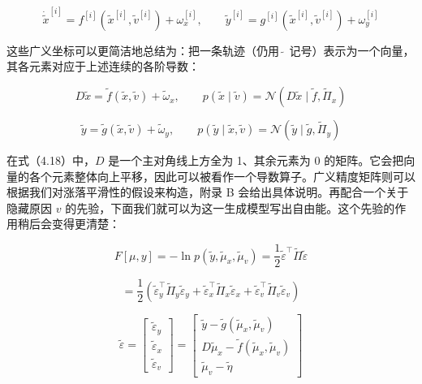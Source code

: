 \begin{equation}
\dot{\tilde{x}}^{[i]} = f^{[i]}(\tilde{x}^{[i]}, \tilde{v}^{[i]}) + \omega_x^{[i]}, \qquad
\tilde{y}^{[i]} = g^{[i]}(\tilde{x}^{[i]}, \tilde{v}^{[i]}) + \omega_y^{[i]}
\tag{4.17}
\end{equation}

这些广义坐标可以更简洁地总结为：把一条轨迹（仍用 $\tilde{\ }$ 记号）表示为一个向量，其各元素对应于上述连续的各阶导数：

\begin{equation}
D\tilde{x} = \tilde{f}(\tilde{x}, \tilde{v}) + \tilde{\omega}_x,
\qquad
p(\tilde{x} \mid \tilde{v}) = \mathcal{N}(D\tilde{x} \mid \tilde{f}, \tilde{\Pi}_x)
\tag{4.18}
\end{equation}

\begin{equation}
\tilde{y} = \tilde{g}(\tilde{x}, \tilde{v}) + \tilde{\omega}_y,
\qquad
p(\tilde{y} \mid \tilde{x}, \tilde{v}) = \mathcal{N}(\tilde{y} \mid \tilde{g}, \tilde{\Pi}_y)
\tag{4.18}
\end{equation}

在式（4.18）中，$D$ 是一个主对角线上方全为 1、其余元素为 0 的矩阵。它会把向量的各个元素整体向上平移，因此可以被看作一个导数算子。广义精度矩阵则可以根据我们对涨落平滑性的假设来构造，附录 B 会给出具体说明。再配合一个关于隐藏原因 $v$ 的先验，下面我们就可以为这一生成模型写出自由能。这个先验的作用稍后会变得更清楚：

\begin{equation}
F[\mu, y] = -\ln p(\tilde{y}, \tilde{\mu}_x, \tilde{\mu}_v)
= \frac{1}{2}\tilde{\varepsilon}^{\top}\tilde{\Pi}\tilde{\varepsilon}
\tag{4.19}
\end{equation}

\begin{equation}
= \frac{1}{2}
\left(
\tilde{\varepsilon}_y^{\top}\tilde{\Pi}_y\tilde{\varepsilon}_y
+ \tilde{\varepsilon}_x^{\top}\tilde{\Pi}_x\tilde{\varepsilon}_x
+ \tilde{\varepsilon}_v^{\top}\tilde{\Pi}_v\tilde{\varepsilon}_v
\right)
\tag{4.19}
\end{equation}

\begin{equation}
\tilde{\varepsilon}
=
\begin{bmatrix}
\tilde{\varepsilon}_y \\
\tilde{\varepsilon}_x \\
\tilde{\varepsilon}_v
\end{bmatrix}
=
\begin{bmatrix}
\tilde{y} - \tilde{g}(\tilde{\mu}_x, \tilde{\mu}_v) \\
D\tilde{\mu}_x - \tilde{f}(\tilde{\mu}_x, \tilde{\mu}_v) \\
\tilde{\mu}_v - \tilde{\eta}
\end{bmatrix}
\tag{4.19}
\end{equation}

